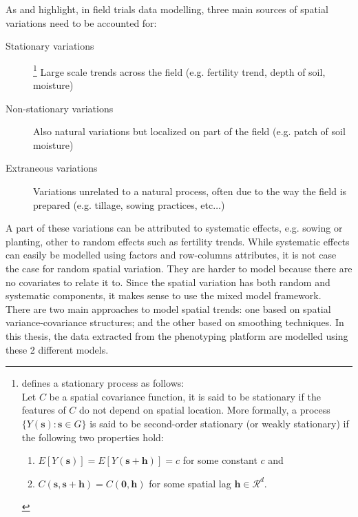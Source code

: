 As \textcite{wilkinson_nearest_1983} and \textcite{gilmour_accounting_1997} highlight, in field trials data modelling, three main sources of spatial variations need to be accounted for:
\begin{description}
    \item[Stationary variations] 
    	\footnote{\textcite{risser_nonstationary_2016} defines a stationary process as follows:\\
	    Let $C$ be a spatial covariance function, it is said to be stationary if the features of $C$ do not depend on spatial 
	    location. More formally, a process $\{Y(\mathbf{s}) : \mathbf{s} \in G\}$ is said to be second-order stationary (or 
	    weakly 
	    stationary) if the following two properties hold:
		    \begin{enumerate}
		        \item $E[Y(\mathbf{s})]=E[Y(\mathbf{s}+\mathbf{h})]=c$ for some constant $c$ and 
		        \item $C(\mathbf{s}, \mathbf{s}+\mathbf{h})=C(\mathbf{0}, \mathbf{h})$
		        for some spatial lag $\mathbf{h} \in \mathcal{R}^{d}$.
		    \end{enumerate}
	    }
    Large scale trends across the field (e.g. fertility trend, depth of soil, moisture)
    \item[Non-stationary variations] Also natural variations but localized on part of the field (e.g. patch of soil moisture)
    \item[Extraneous variations] Variations unrelated to a natural process, often due to the way the field is prepared (e.g. 
    tillage, sowing practices, etc$\ldots$)
\end{description}
A part of these variations can be attributed to systematic effects, e.g. sowing or planting, other to random effects such as fertility trends. While systematic effects can easily be modelled using factors and row-columns attributes, it is not case the case for random spatial variation. They are harder to model because there are no covariates to relate it to. Since the spatial variation has both random and systematic components, it makes sense to use the mixed model framework.\\
There are two main approaches to model spatial trends: one based on spatial variance-covariance structures; and the other based on smoothing techniques. In this thesis, the data extracted from the phenotyping platform are modelled using these 2 different models.

